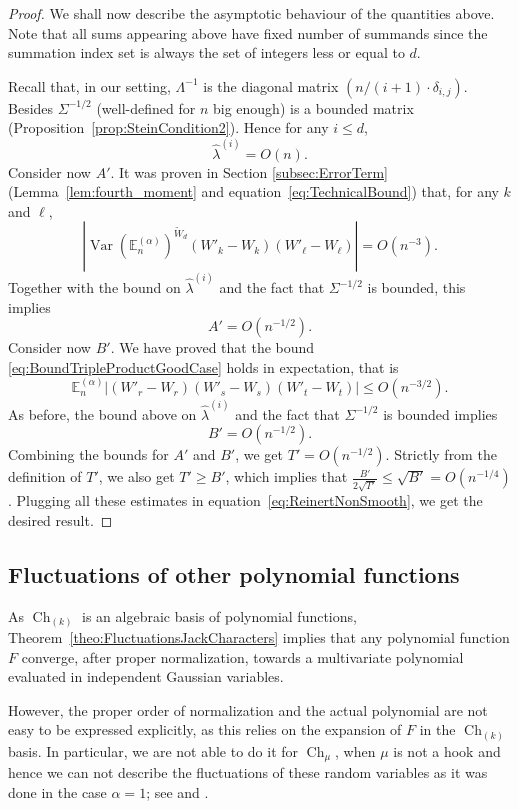 \documentclass[11pt]{amsart}
\theoremstyle{plain}
\theoremstyle{remark}
\newcommand{\esper}{\mathbb{E}}
\DeclareMathOperator{\Var}{Var}
\DeclareMathOperator{\Ch}{Ch}
\begin{document}
\begin{proof}
    We shall now describe the asymptotic behaviour of the quantities above.
    Note that all sums appearing above have fixed number of summands since
    the summation index set is always the set of integers less or equal to $d$.

    Recall that, in our setting, $\Lambda^{-1}$ is the diagonal matrix $(n/(i+1) \cdot  \delta_{i,j})$.
    Besides $\varSigma^{-1/2}$ (well-defined for $n$ big enough) is a bounded matrix 
    (Proposition~\ref{prop:SteinCondition2}).
    Hence for any $i \le d$,
    \[\hat{\lambda}^{(i)} = O(n).\]
    Consider now $A'$. It was proven in Section \ref{subsec:ErrorTerm}
    (Lemma~\ref{lem:fourth_moment} and equation~\eqref{eq:TechnicalBound})
    that, for any $k$ and $\ell$,
    \[|\Var (\esper_n^{(\alpha)})^{\tilde{W}_d} (W'_k -W_k)(W'_\ell-W_\ell) | = O(n^{-3}).\]
    Together with the bound on $\hat{\lambda}^{(i)}$ and the fact that
    $\varSigma^{-1/2}$ is bounded, this implies
    \[A'=O(n^{-1/2}).\]
    Consider now $B'$. We have proved that the bound \eqref{eq:BoundTripleProductGoodCase}
    holds in expectation, that is
    \[\esper_n^{(\alpha)} \left|(W'_r -W_r)(W'_s -W_s)(W'_t -W_t)\right| \leq O(n^{-3/2}). \]
    As before, the bound above on $\hat{\lambda}^{(i)}$ and the fact that
    $\varSigma^{-1/2}$ is bounded implies
    \[B'=O(n^{-1/2}).\]
    Combining the bounds for $A'$ and $B'$, we get $T' = O(n^{-1/2})$.
    Strictly from the definition of $T'$, we also get
    $T' \ge B'$, which implies that $\frac{B'}{2\sqrt{T'}} \le \sqrt{B'}=O(n^{-1/4})$.
    Plugging all these estimates in equation~\eqref{eq:ReinertNonSmooth},
    we get the desired result.
\end{proof}


\subsection{Fluctuations of other polynomial functions}\label{subsect:Fluct_NonHook}

As $\Ch_{(k)}$ is an algebraic basis of polynomial functions,
Theorem~\ref{theo:FluctuationsJackCharacters} implies that any polynomial function $F$
converge, after proper normalization, towards a multivariate polynomial evaluated in independent
Gaussian variables.

However, the proper order of normalization and the actual polynomial are not easy
to be expressed explicitly, as this relies on the expansion of $F$ in the $\Ch_{(k)}$ basis.
In particular, we are not able to do it for $\Ch_{\mu}$, when $\mu$ is not a hook and hence
we can not describe the fluctuations of these random variables
as it was done in the case $\alpha=1$;
see \cite{HoraFluctuationsCharacters} and \cite[Theorem 6.5]{IvanovOlshanski2002}.
\end{document}

